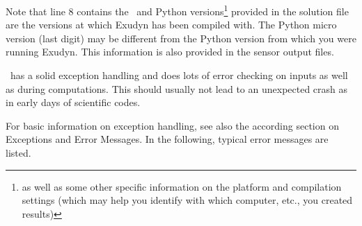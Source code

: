 Note that line 8 contains the \codeName\ and Python versions\footnote{as well as some other specific information on the platform and compilation settings (which may help you identify with which computer, etc., you created results)} provided in the solution file are the versions at which Exudyn has been compiled with.
The Python micro version (last digit) may be different from the Python version from which you were running Exudyn.
This information is also provided in the sensor output files.
%
\newpage
{}

\codeName\ has a solid exception handling and does lots of error checking on
inputs as well as during computations. This should usually not lead to an
unexpected crash as in early days of scientific codes.

For basic information on exception handling, see also the according section on
Exceptions and Error Messages. In the following, typical error messages are listed. 

